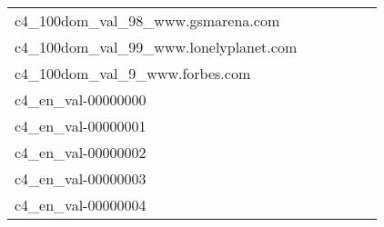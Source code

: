 {\begin{longtable}{m{6cm}m{1.7cm}m{1.7cm}m{1.7cm}m{1.7cm}m{1.7cm}}
	c4\_100dom\_val\_98\_www.gsmarena.com  & \colorbox[HTML]{fefee0}{\makebox[\mywidth][c]{23.21}} & \colorbox[HTML]{ddf1a6}{\makebox[\mywidth][c]{22.15}} & \colorbox[HTML]{ffffe5}{\makebox[\mywidth][c]{24.52}} & \colorbox[HTML]{d5eea1}{\makebox[\mywidth][c]{22.10}} & \colorbox[HTML]{77c578}{\makebox[\mywidth][c]{21.76}}\\
	c4\_100dom\_val\_99\_www.lonelyplanet.com  & \colorbox[HTML]{fcfed8}{\makebox[\mywidth][c]{11.33}} & \colorbox[HTML]{def2a6}{\makebox[\mywidth][c]{10.92}} & \colorbox[HTML]{ffffe5}{\makebox[\mywidth][c]{12.28}} & \colorbox[HTML]{c5e799}{\makebox[\mywidth][c]{10.84}} & \colorbox[HTML]{77c578}{\makebox[\mywidth][c]{10.69}}\\
	c4\_100dom\_val\_9\_www.forbes.com  & \colorbox[HTML]{fcfed7}{\makebox[\mywidth][c]{13.72}} & \colorbox[HTML]{d1ec9f}{\makebox[\mywidth][c]{13.31}} & \colorbox[HTML]{ffffe5}{\makebox[\mywidth][c]{14.63}} & \colorbox[HTML]{dbf1a4}{\makebox[\mywidth][c]{13.34}} & \colorbox[HTML]{77c578}{\makebox[\mywidth][c]{13.13}}\\
	c4\_en\_val-00000000  & \colorbox[HTML]{ffffe5}{\makebox[\mywidth][c]{14.34}} & \colorbox[HTML]{e5f5ac}{\makebox[\mywidth][c]{13.70}} & \colorbox[HTML]{ffffe5}{\makebox[\mywidth][c]{14.87}} & \colorbox[HTML]{e0f2a8}{\makebox[\mywidth][c]{13.67}} & \colorbox[HTML]{77c578}{\makebox[\mywidth][c]{13.46}}\\
	c4\_en\_val-00000001  & \colorbox[HTML]{fefee2}{\makebox[\mywidth][c]{14.86}} & \colorbox[HTML]{d8efa2}{\makebox[\mywidth][c]{14.28}} & \colorbox[HTML]{ffffe5}{\makebox[\mywidth][c]{15.51}} & \colorbox[HTML]{bfe596}{\makebox[\mywidth][c]{14.21}} & \colorbox[HTML]{77c578}{\makebox[\mywidth][c]{14.09}}\\
	c4\_en\_val-00000002  & \colorbox[HTML]{fefee2}{\makebox[\mywidth][c]{15.29}} & \colorbox[HTML]{dbf1a4}{\makebox[\mywidth][c]{14.71}} & \colorbox[HTML]{ffffe5}{\makebox[\mywidth][c]{15.95}} & \colorbox[HTML]{dcf1a5}{\makebox[\mywidth][c]{14.71}} & \colorbox[HTML]{77c578}{\makebox[\mywidth][c]{14.51}}\\
	c4\_en\_val-00000003  & \colorbox[HTML]{ffffe5}{\makebox[\mywidth][c]{12.95}} & \colorbox[HTML]{e8f6ae}{\makebox[\mywidth][c]{12.28}} & \colorbox[HTML]{ffffe5}{\makebox[\mywidth][c]{13.32}} & \colorbox[HTML]{dbf1a4}{\makebox[\mywidth][c]{12.23}} & \colorbox[HTML]{77c578}{\makebox[\mywidth][c]{12.06}}\\
	c4\_en\_val-00000004  & \colorbox[HTML]{fdfedf}{\makebox[\mywidth][c]{12.56}} & \colorbox[HTML]{eaf7af}{\makebox[\mywidth][c]{12.13}} & \colorbox[HTML]{ffffe5}{\makebox[\mywidth][c]{13.27}} & \colorbox[HTML]{d9f0a3}{\makebox[\mywidth][c]{12.05}} & \colorbox[HTML]{77c578}{\makebox[\mywidth][c]{11.87}}\\

\end{longtable}}
